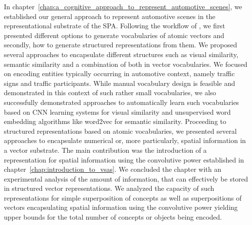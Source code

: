 In chapter~\ref{chap:a_cognitive_approach_to_represent_automotive_scenes}, we established our general approach to represent automotive scenes in the representational substrate of the \ac{SPA}.
Following the workflow of \textcite{Gallant2013}, we first presented different options to generate vocabularies of atomic vectors and secondly, how to generate structured representations from them. 
We proposed several approaches to encapsulate different structures such as visual similarity, semantic similarity and a combination of both in vector vocabularies.
We focused on encoding entities typically occurring in automotive context, namely traffic signs and traffic participants.
While manual vocabulary design is feasible and demonstrated in this context of such rather small vocabularies, we also successfully demonstrated approaches to automatically learn such vocabularies based on \ac{CNN} learning systems for visual similarity and unsupervised word embedding algorithms like word2vec for semantic similarity.
Proceeding to structured representations based on atomic vocabularies, we presented several approaches to encapsulate numerical or, more particularly, spatial information in a vector substrate.
The main contribution was the introduction of a representation for spatial information using the convolutive power established in chapter~\ref{chap:introduction_to_vsas}.
We concluded the chapter with an experimental analysis of the amount of information, that can effectively be stored in structured vector representations.
We analyzed the capacity of such representations for simple superposition of concepts as well as superpositions of vectors encapsulating spatial information using the convolutive power yielding upper bounds for the total number of concepts or objects being encoded.
 
